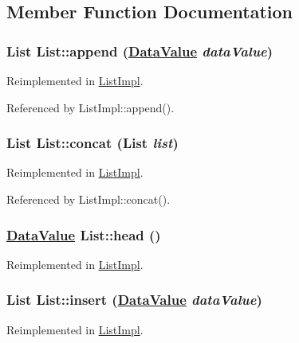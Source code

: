 \subsection{Member Function Documentation}
\hypertarget{interfaceList_a3}{
\subsubsection[append]{\setlength{\rightskip}{0pt plus 5cm}List List::append (\hyperlink{interfaceDataValue}{Data\-Value} {\em data\-Value})}}
\label{interfaceList_a3}




Reimplemented in \hyperlink{classListImpl_a3}{List\-Impl}.

Referenced by List\-Impl::append().

\hypertarget{interfaceList_a4}{
\subsubsection[concat]{\setlength{\rightskip}{0pt plus 5cm}List List::concat (List {\em list})}}
\label{interfaceList_a4}




Reimplemented in \hyperlink{classListImpl_a4}{List\-Impl}.

Referenced by List\-Impl::concat().

\hypertarget{interfaceList_a0}{
\subsubsection[head]{\setlength{\rightskip}{0pt plus 5cm}\hyperlink{interfaceDataValue}{Data\-Value} List::head ()}}
\label{interfaceList_a0}




Reimplemented in \hyperlink{classListImpl_a0}{List\-Impl}.\hypertarget{interfaceList_a2}{
\subsubsection[insert]{\setlength{\rightskip}{0pt plus 5cm}List List::insert (\hyperlink{interfaceDataValue}{Data\-Value} {\em data\-Value})}}
\label{interfaceList_a2}




Reimplemented in \hyperlink{classListImpl_a2}{List\-Impl}.

